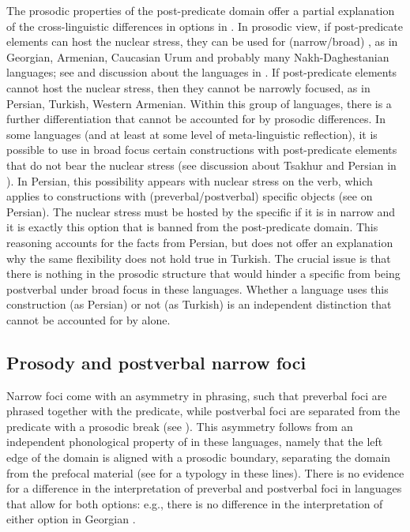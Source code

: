 \documentclass[output=paper,colorlinks,citecolor=brown]{langscibook}
\begin{document}
The prosodic properties of the post-predicate domain offer a partial explanation of the cross-linguistic differences in  options in . In prosodic view, if post-predicate elements can host the nuclear stress, they can be used for (narrow/broad) , as in Georgian, Armenian, Caucasian Urum and probably many Nakh-Daghestanian languages; see  and discussion about the languages in . If post-predicate elements cannot host the nuclear stress, then they cannot be narrowly focused, as in Persian, Turkish, Western Armenian. Within this group of languages, there is a further differentiation that cannot be accounted for by prosodic differences. In some languages (and at least at some level of meta-linguistic reflection), it is possible to use in broad focus certain constructions with post-predicate elements that do not bear the nuclear stress (see discussion about Tsakhur and Persian in ). In Persian, this possibility appears with nuclear stress on the verb, which applies to constructions with (preverbal/postverbal) specific objects (see \citealt[133--134]{modarresi_bare_2014} on Persian). The nuclear stress must be hosted by the specific  if it is in narrow  and it is exactly this  option that is banned from the post-predicate domain. This reasoning accounts for the facts from Persian, but does not offer an explanation why the same flexibility does not hold true in Turkish. The crucial issue is that there is nothing in the prosodic structure that would hinder a specific  from being postverbal under broad focus in these languages. Whether a language uses this construction (as Persian) or not (as Turkish) is an independent distinction that cannot be accounted for by  alone.



\subsection{Prosody and postverbal narrow foci} 

Narrow foci come with an asymmetry in phrasing, such that preverbal foci are phrased together with the predicate, while postverbal foci are separated from the predicate with a prosodic break (see ). This asymmetry follows from an independent phonological property of  in these languages, namely that the left edge of the  domain is aligned with a prosodic boundary, separating the  domain from the prefocal material (see \citealt{fery_focus_2013} for a typology in these lines). There is no evidence for a difference in the interpretation of preverbal and postverbal foci in languages that allow for both options: e.g., there is no difference in the interpretation of either option in Georgian  \citep[]{skopeteas_Fanselow_focus_2010}.
\end{document}
